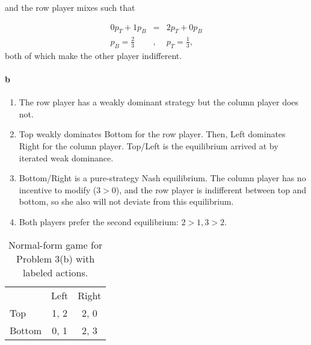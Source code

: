 \begin{answer}{3}
and the row player mixes such that

\begin{eqnarray*}
0 p_T + 1 p_B &=& 2 p_T + 0 p_B \\
p_B = \frac{2}{3} &,& p_T = \frac{1}{3},
\end{eqnarray*}
both of which make the other player indifferent. 


\paragraph{b} 

\begin{enumerate}
\item The row player has a weakly dominant strategy but the column player does not.
\item Top weakly dominates Bottom for the row player. Then, Left dominates Right for the column player. Top/Left is the equilibrium arrived at by iterated weak dominance.
\item Bottom/Right is a pure-strategy Nash equilibrium. The column player has no incentive to modify ($3>0$), and the row player is indifferent between top and bottom, so she also will not deviate from this equilibrium.
\item Both players prefer the second equilibrium: $2>1, 3>2$.
\end{enumerate}

\begin{table}[h!]
\begin{center}
\begin{tabular}{l|c|c|}
\multicolumn{1}{c}{} & \multicolumn{1}{c}{Left} & \multicolumn{1}{c}{Right} \\
\cline{2-3}
Top    & 1, 2 & 2, 0  \\
\cline{2-3}
Bottom & 0, 1 & 2, 3 \\
\cline{2-3}
\end{tabular}
\caption{Normal-form game for Problem 3(b) with labeled actions.}
\label{tab:3b}
\end{center}
\end{table}


\end{answer}
